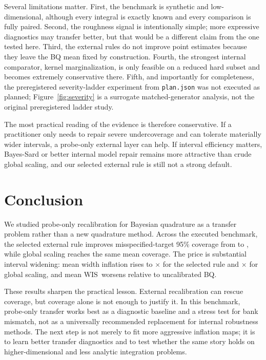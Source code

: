 \documentclass{article}
\newcommand{\wis}{\ensuremath{\mathrm{WIS}}}
\begin{document}
Several limitations matter. First, the benchmark is synthetic and low-dimensional, although every integral is exactly known and every comparison is fully paired. Second, the roughness signal is intentionally simple; more expressive diagnostics may transfer better, but that would be a different claim from the one tested here. Third, the external rules do not improve point estimates because they leave the BQ mean fixed by construction. Fourth, the strongest internal comparator, kernel marginalization, is only feasible on a reduced hard subset and becomes extremely conservative there. Fifth, and importantly for completeness, the preregistered severity-ladder experiment from \texttt{plan.json} was not executed as planned; Figure~\ref{fig:severity} is a surrogate matched-generator analysis, not the original preregistered ladder study.

The most practical reading of the evidence is therefore conservative. If a practitioner only needs to repair severe undercoverage and can tolerate materially wider intervals, a probe-only external layer can help. If interval efficiency matters, Bayes-Sard or better internal model repair remains more attractive than crude global scaling, and our selected external rule is still not a strong default.

\section{Conclusion}
\label{sec:conclusion}
We studied probe-only recalibration for Bayesian quadrature as a transfer problem rather than a new quadrature method. Across the executed benchmark, the selected external rule improves misspecified-target 95\% coverage from \MissUncalCoverage{} to \MissSelectedCoverage{}, while global scaling reaches the same mean coverage. The price is substantial interval widening: mean width inflation rises to \MissSelectedWidthInfl{}$\times$ for the selected rule and \MissGlobalWidthInfl{}$\times$ for global scaling, and mean \wis\ worsens relative to uncalibrated BQ.

These results sharpen the practical lesson. External recalibration can rescue coverage, but coverage alone is not enough to justify it. In this benchmark, probe-only transfer works best as a diagnostic baseline and a stress test for bank mismatch, not as a universally recommended replacement for internal robustness methods. The next step is not merely to fit more aggressive inflation maps; it is to learn better transfer diagnostics and to test whether the same story holds on higher-dimensional and less analytic integration problems.
\end{document}
